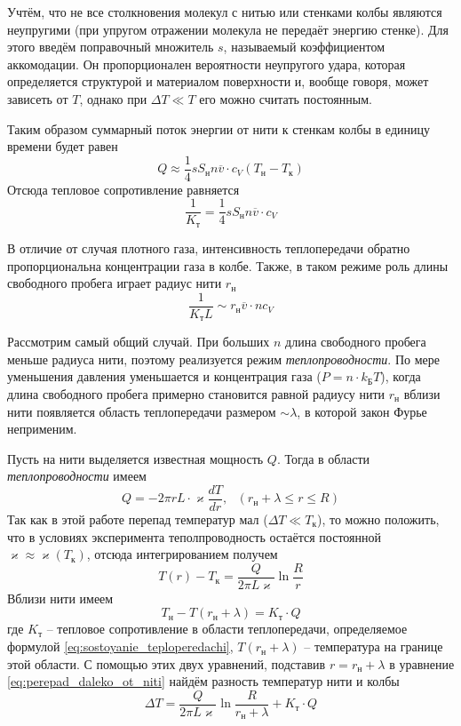 \documentclass[a4paper,12pt]{article}
\begin{document}
Учтём, что не все столкновения молекул с нитью или стенками колбы являются неупругими (при упругом отражении молекула не передаёт энергию стенке). Для этого введём поправочный множитель $s$, называемый коэффициентом аккомодации. Он пропорционален вероятности неупругого удара, которая определяется структурой и материалом поверхности и, вообще говоря, может зависеть от $T$, однако при $\Delta T \ll T$ его можно считать постоянным.

Таким образом суммарный поток энергии от нити к стенкам колбы в единицу времени будет равен
\[Q \approx \frac{1}{4} s S_н n \overline{v}\cdot c_{V} (T_н - T_к) \]
Отсюда тепловое сопротивление равняется 
\begin{equation}\label{eq:sostoyanie_teploperedachi}
    \frac{1}{K_т} = \frac{1}{4} s S_н n \overline{v}\cdot c_{V}
\end{equation}

В отличие от случая плотного газа, интенсивность теплопередачи обратно пропорциональна концентрации газа в колбе. Также, в таком режиме роль длины свободного пробега играет радиус нити $r_н$
\[\frac{1}{K_тL} \sim r_н \overline{v}\cdot n c_V\]

Рассмотрим самый общий случай. При больших $n$ длина свободного пробега меньше радиуса нити, поэтому реализуется режим \textit{теплопроводности}. По мере уменьшения давления уменьшается и концентрация газа ($P = n \cdot k_Б T$), когда длина свободного пробега примерно становится равной радиусу нити $r_н$ вблизи нити появляется область теплопередачи размером $\sim \lambda$, в которой закон Фурье неприменим. 

Пусть на нити выделяется известная мощность $Q$. Тогда в области \textit{теплопроводности} имеем 
\[Q = -2\pi r L\cdot\varkappa\frac{dT}{dr}, \text{ }(r_н + \lambda\leq r \leq R )\]
Так как в этой работе перепад температур мал ($\Delta T \ll T_к$), то можно положить, что в условиях эксперимента теполпроводность остаётся постоянной $\varkappa \approx \varkappa(T_к)$, отсюда интегрированием получем
\begin{equation}\label{eq:perepad_daleko_ot_niti}
    T(r) - T_к = \frac{Q}{2\pi L\varkappa}\ln{\frac{R}{r}}
\end{equation}
Вблизи нити имеем
\begin{equation}\label{eq:perepad_vblizi_niti}
    T_н - T(r_н + \lambda) = K_т\cdot Q
\end{equation}
где $K_т$ -- тепловое сопротивление в области теплопередачи, определяемое формулой \eqref{eq:sostoyanie_teploperedachi}, $T(r_н + \lambda)$ -- температура на границе этой области. С помощью этих двух уравнений, подставив $r = r_н + \lambda$ в уравнение \eqref{eq:perepad_daleko_ot_niti} найдём разность температур нити и колбы 
\[\Delta T = \frac{Q}{2\pi L\varkappa}\ln{\frac{R}{r_н + \lambda}} + K_т\cdot Q\]
\end{document}
